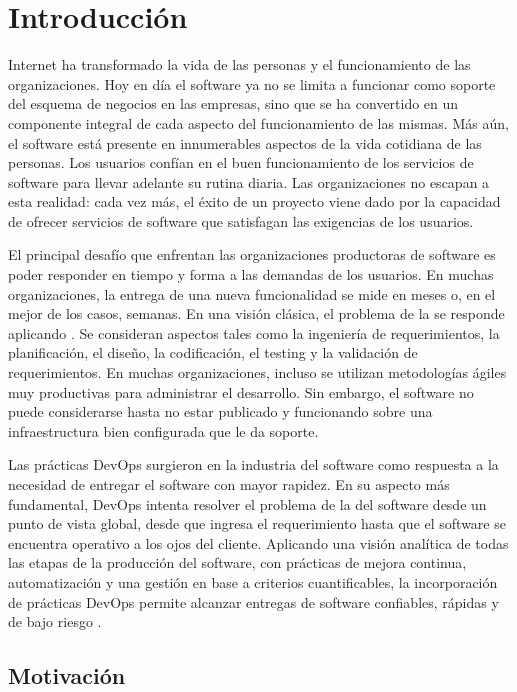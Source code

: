 \chapter{Introducción}

Internet ha transformado la vida de las personas y el funcionamiento
de las organizaciones. Hoy en día el software ya no se limita a
funcionar como soporte del esquema de negocios en las empresas, sino
que se ha convertido en un componente integral de cada aspecto del
funcionamiento de las mismas. Más aún, el software está presente en
innumerables aspectos de la vida cotidiana de las personas. Los
usuarios confían en el buen funcionamiento de los servicios de
software para llevar adelante su rutina diaria. Las organizaciones no
escapan a esta realidad: cada vez más, el éxito de un proyecto viene
dado por la capacidad de ofrecer servicios de software que satisfagan
las exigencias de los usuarios.

El principal desafío que enfrentan las organizaciones productoras de
software es poder responder en tiempo y forma a las demandas de los
usuarios. En muchas organizaciones, la entrega de una nueva
funcionalidad se mide en meses o, en el mejor de los casos,
semanas. En una visión clásica, el problema de la  se responde aplicando . Se
consideran aspectos tales como la ingeniería de requerimientos, la
planificación, el diseño, la codificación, el testing y la validación
de requerimientos. En muchas organizaciones, incluso se utilizan
metodologías ágiles muy productivas para administrar el
desarrollo. Sin embargo, el software no puede considerarse
 hasta no estar publicado y funcionando sobre una
infraestructura bien configurada que le da soporte.

Las prácticas DevOps surgieron en la industria del software como
respuesta a la necesidad de entregar el software con mayor rapidez. En
su aspecto más fundamental, DevOps intenta resolver el problema de la
 del software desde un punto de vista global, desde
que ingresa el requerimiento hasta que el software se encuentra
operativo a los ojos del cliente. Aplicando una visión analítica de
todas las etapas de la producción del software, con prácticas de
mejora continua, automatización y una gestión en base a criterios
cuantificables, la incorporación de prácticas DevOps permite alcanzar
entregas de software confiables, rápidas y de bajo riesgo
\cite{humblefarley}.

\section{Motivación}

